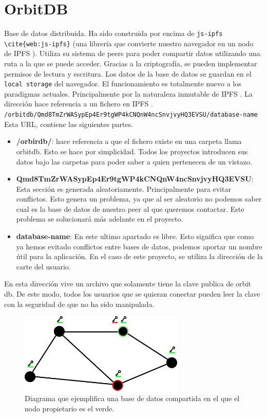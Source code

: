 \section{OrbitDB}
Base de datos distribuida. Ha sido construida por encima de \verb|js-ipfs \cite{web:js-ipfs}| (una librería que convierte nuestro navegador en un nodo de IPFS \cite{web:ipfs}). Utiliza su sistema de peers para poder compartir datos utilizando una ruta a la que se puede acceder. Gracias a la criptografía, se pueden implementar permisos de lectura y escritura. Los datos de la base de datos se guardan en el \verb|local storage| del navegador.
El funcionamiento es totalmente nuevo a los paradigmas actuales. Principalmente por la naturaleza inmutable de IPFS \cite{web:ipfs}. La dirección hace referencia a un fichero en IPFS \cite{web:ipfs}.\\
\verb|/orbitdb/Qmd8TmZrWASypEp4Er9tgWP4kCNQnW4ncSnvjvyHQ3EVSU/database-name|\\
Esta URL, contiene las siguientes partes.
\begin{itemize}
    \item \textbf{/orbirdb/}: hace referencia a que el fichero existe en una carpeta llama orbitdb. Esto se hace por simplicidad. Todos los proyectos introducen sus datos bajo las carpetas para poder saber a quien pertenecen de un vistazo.
    \item \textbf{Qmd8TmZrWASypEp4Er9tgWP4kCNQnW4ncSnvjvyHQ3EVSU}: Esta sección es generada aleatoriamente. Principalmente para evitar conflictos. Esto genera un problema, ya que al ser aleatorio no podemos saber cual es la base de datos de nuestro peer al que queremos contactar. Este problema se solucionará más adelante en el proyecto.
    \item \textbf{database-name}: En este ultimo apartado es libre. Esto significa que como ya hemos evitado conflictos entre bases de datos, podemos aportar un nombre útil para la aplicación. En el caso de este proyecto, se utiliza la dirección de la carte del usuario. 
\end{itemize}
En esta dirección vive un archivo que solamente tiene la clave publica de orbit db. De este modo, todos los usuarios que se quieran conectar pueden leer la clave con la seguridad de que no ha sido manipulada.
\begin{figure}[h!]
    \centering
    \includegraphics[width=0.7\textwidth]{Figures/Orbitdb.png}
    \caption[Diagrama básico de conexión de orbitdb]{Diagrama que ejemplifica una base de datos compartida en el que el nodo propietario es el verde.}
    \label{fg:orbit}
\end{figure}
